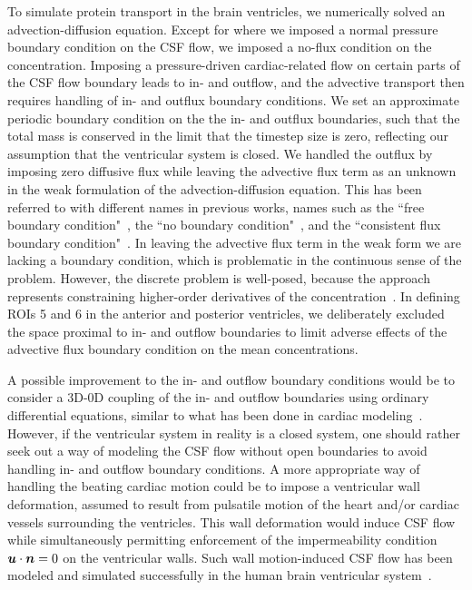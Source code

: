 \documentclass{WileyMSP-template}
\begin{document}
To simulate protein transport in the brain ventricles, we numerically solved
an advection-diffusion equation. Except for where we imposed a normal pressure
boundary condition on the CSF flow,
we imposed a no-flux condition on the concentration. Imposing a pressure-driven
cardiac-related flow on certain parts of the CSF flow boundary leads to in- and outflow,
and the advective transport then requires handling of in- and outflux boundary conditions.
We set an approximate periodic boundary condition on the the in- and outflux boundaries,
such that the total mass is conserved in the
limit that the timestep size is zero, reflecting our assumption that the
ventricular system is closed.
We handled the outflux by imposing zero diffusive flux while
leaving the advective flux term as an unknown in the weak formulation
of the advection-diffusion equation. This has been referred to with different names
in previous works, names such as the ``free boundary condition"~\cite{Papanastasiou1992ACondition},
the ``no boundary condition"~\cite{Griffiths1997TheCondition}, and the 
``consistent flux boundary condition"~\cite{Lynch2020NumericalHemodynamics}. 
In leaving the advective flux term in the weak form we are lacking a boundary condition,
which is problematic in the continuous sense of the problem.
However, the discrete problem is well-posed, because the approach represents
constraining higher-order derivatives of the concentration~\cite{Griffiths1997TheCondition}. 
In defining ROIs 5 and 6 in the anterior and posterior ventricles,
we deliberately excluded the space proximal to
in- and outflow boundaries to limit adverse effects of 
the advective flux boundary condition on the mean concentrations. 

A possible improvement to the in- and outflow boundary conditions would be
to consider a 3D-0D coupling of the in- and outflow boundaries using
ordinary differential equations,
similar to what has been done in cardiac
modeling~\cite{Brown2024AMechanics, Augustin2021ACirculation}.
However, if the ventricular system in reality is a closed system,
one should rather seek out a way of modeling the CSF flow without open boundaries to avoid
handling in- and outflow boundary conditions. A more appropriate way of handling the beating
cardiac motion could be to impose a ventricular wall deformation, assumed to result from pulsatile
motion of the heart and/or cardiac vessels surrounding the ventricles. This wall deformation would
induce CSF flow while simultaneously permitting enforcement of the impermeability condition
$\bm{u}\cdot\bm{n}=0$ on the ventricular walls. Such wall motion-induced CSF flow has been modeled and
simulated successfully in the human brain ventricular system~\cite{Causemann2022HumanFramework,
Kurtcuoglu2005ComputationalSystem, Kurtcuoglu2007ComputationalSylvius, Linninger2005PulsatileBrain}.
\end{document}
